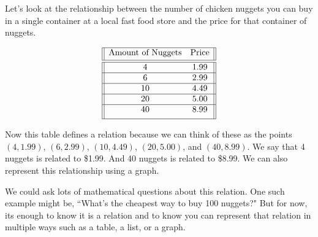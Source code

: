 \documentclass[nooutcomes]{ximera}
\begin{document}
\begin{example}
Let's look at the relationship between the number of chicken nuggets
you can buy in a single container at a local fast food store and the
price for that container of nuggets.

$$
 \begin{array}{||c c||} 
 \hline
 \text{Amount of Nuggets} & \text{Price} \\[0.5ex] 
 \hline\hline
 4 & 1.99\\ 
 \hline
 6 & 2.99 \\
 \hline
 10 & 4.49\\
 \hline
 20 & 5.00 \\
 \hline
 40 & 8.99\\[1ex] 
 \hline
\end{array}
$$

\begin{explanation}
Now this table defines a relation because we can think of these as the points $(4,1.99)$, $(6,2.99)$, $(10,4.49)$, $(20,5.00)$, and $(40, 8.99)$.  We say that 4 nuggets is related to \$1.99.  And 40 nuggets is related to \$8.99.  We can also represent this relationship using a graph.

\begin{image}
\end{image}

We could ask lots of mathematical questions about this relation.  One such example might be, ``What's the cheapest way to buy 100 nuggets?"  But for now, its enough to know it is a relation and to know you can represent that relation in multiple ways such as a table, a list, or a graph.
\end{explanation}
\end{example}
\end{document}
